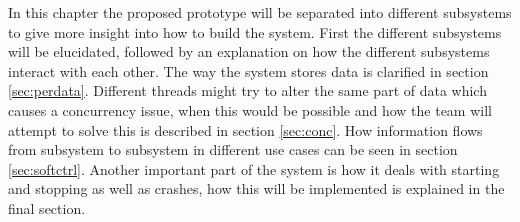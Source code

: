 In this chapter the proposed prototype will be separated into different subsystems to give more insight into how to build the system. First the different subsystems will be elucidated, followed by an explanation on how the different subsystems interact with each other. The way the system stores data is clarified in section \ref{sec:perdata}. Different threads might try to alter the same part of data which causes a concurrency issue, when this would be possible and how the team will attempt to solve this is described in section \ref{sec:conc}. How information flows from subsystem to subsystem in different use cases can be seen in section \ref{sec:softctrl}. Another important part of the system is how it deals with starting and stopping as well as crashes, how this will be implemented is explained in the final section.